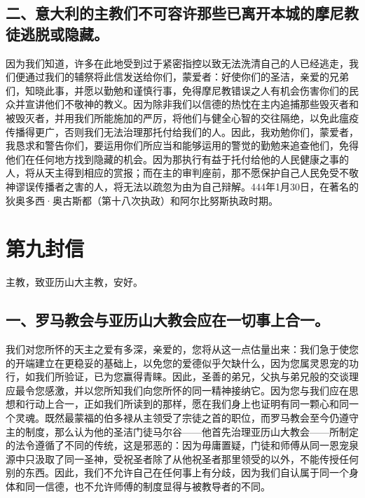 
\subsection{二、意大利的主教们不可容许那些已离开本城的摩尼教徒逃脱或隐藏。}

因为我们知道，许多在此地受到过于紧密指控以致无法洗清自己的人已经逃走，我们便通过我们的辅祭将此信发送给你们，蒙爱者：好使你们的圣洁，亲爱的兄弟们，知晓此事，并愿以勤勉和谨慎行事，免得摩尼教错误之人有机会伤害你们的民众并宣讲他们不敬神的教义。因为除非我们以信德的热忱在主内追捕那些毁灭者和被毁灭者，并用我们所能施加的严厉，将他们与健全心智的交往隔绝，以免此瘟疫传播得更广，否则我们无法治理那托付给我们的人。因此，我劝勉你们，蒙爱者，我恳求和警告你们，要运用你们所应当和能够运用的警觉的勤勉来追查他们，免得他们在任何地方找到隐藏的机会。因为那执行有益于托付给他的人民健康之事的人，将从天主得到相应的赏报；而在主的审判座前，那不愿保护自己人民免受不敬神谬误传播者之害的人，将无法以疏忽为由为自己辩解。\newline{}444年1月30日，在著名的狄奥多西·奥古斯都（第十八次执政）和阿尔比努斯执政时期。\par



\section{第九封信}

主教，致亚历山大主教，安好。\par


\subsection{一、罗马教会与亚历山大教会应在一切事上合一。}

我们对您所怀的天主之爱有多深，亲爱的，您将从这一点估量出来：我们急于使您的开端建立在更稳妥的基础上，以免您的爱德似乎欠缺什么，因为您属灵恩宠的功行，如我们所验证，已为您赢得青睐。因此，圣善的弟兄，父执与弟兄般的交谈理应最令您感激，并以您所知我们向您所怀的同一精神接纳它。因为您与我们应在思想和行动上合一，正如我们所读到的那样，愿在我们身上也证明有同一颗心和同一个灵魂。既然最蒙福的伯多禄从主领受了宗徒之首的职位，而罗马教会至今仍遵守主的制度，那么认为他的圣洁门徒马尔谷——他首先治理亚历山大教会——所制定的法令遵循了不同的传统，这是邪恶的：因为毋庸置疑，门徒和师傅从同一恩宠泉源中只汲取了同一圣神，受祝圣者除了从他祝圣者那里领受的以外，不能传授任何别的东西。因此，我们不允许自己在任何事上有分歧，因为我们自认属于同一个身体和同一信德，也不允许师傅的制度显得与被教导者的不同。\par

